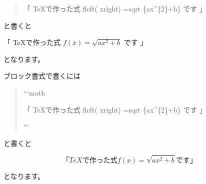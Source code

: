 \begin{quote}
「 TeXで作った式 \textdollar{} f\reviewbackslash{}left( x\reviewbackslash{}right) =\reviewbackslash{}sqrt \{ax\textasciicircum{}\{2\}+b\} \textdollar{} です 」

\end{quote}

と書くと

「 TeXで作った式  $ f\left( x\right) =\sqrt {ax^{2}+b} $  です 」

となります。

ブロック書式で書くには

\begin{quote}
```math

「 TeXで作った式  f\reviewbackslash{}left( x\reviewbackslash{}right) =\reviewbackslash{}sqrt \{ax\textasciicircum{}\{2\}+b\}  です 」

```

\end{quote}

と書くと

\begin{equation*}
「 TeXで作った式  f\left( x\right) =\sqrt {ax^{2}+b}  です 」
\end{equation*}

となります。
